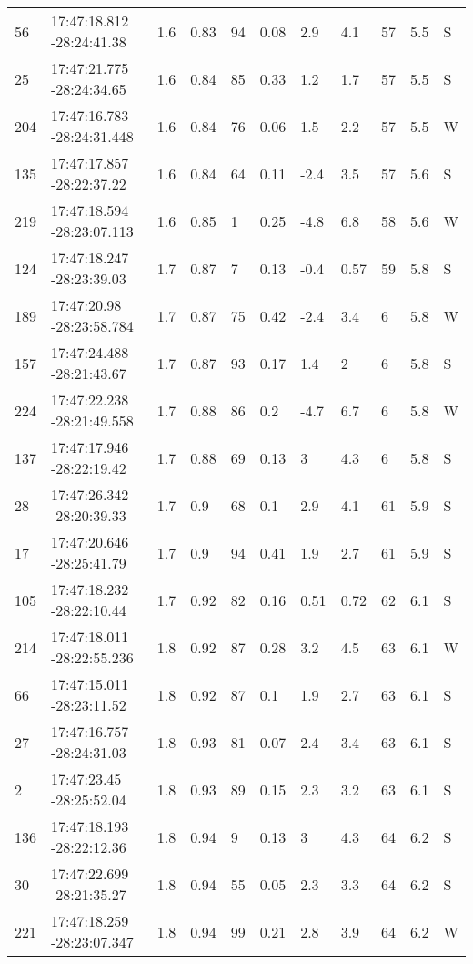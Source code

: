 \begin{deluxetable}[htp]
\begin{tabular}{lllllllllll}
56 & 17:47:18.812 -28:24:41.38 & 1.6 & 0.83 & 94 & 0.08 & 2.9 & 4.1 & 57 & 5.5\ee{24} & S \\
25 & 17:47:21.775 -28:24:34.65 & 1.6 & 0.84 & 85 & 0.33 & 1.2 & 1.7 & 57 & 5.5\ee{24} & S \\
204 & 17:47:16.783 -28:24:31.448 & 1.6 & 0.84 & 76 & 0.06 & 1.5 & 2.2 & 57 & 5.5\ee{24} & W \\
135 & 17:47:17.857 -28:22:37.22 & 1.6 & 0.84 & 64 & 0.11 & -2.4 & 3.5 & 57 & 5.6\ee{24} & S \\
219 & 17:47:18.594 -28:23:07.113 & 1.6 & 0.85 & 1 & 0.25 & -4.8 & 6.8 & 58 & 5.6\ee{24} & W \\
124 & 17:47:18.247 -28:23:39.03 & 1.7 & 0.87 & 7 & 0.13 & -0.4 & 0.57 & 59 & 5.8\ee{24} & S \\
189 & 17:47:20.98 -28:23:58.784 & 1.7 & 0.87 & 75 & 0.42 & -2.4 & 3.4 & 6 & 5.8\ee{24} & W \\
157 & 17:47:24.488 -28:21:43.67 & 1.7 & 0.87 & 93 & 0.17 & 1.4 & 2 & 6 & 5.8\ee{24} & S \\
224 & 17:47:22.238 -28:21:49.558 & 1.7 & 0.88 & 86 & 0.2 & -4.7 & 6.7 & 6 & 5.8\ee{24} & W \\
137 & 17:47:17.946 -28:22:19.42 & 1.7 & 0.88 & 69 & 0.13 & 3 & 4.3 & 6 & 5.8\ee{24} & S \\
28 & 17:47:26.342 -28:20:39.33 & 1.7 & 0.9 & 68 & 0.1 & 2.9 & 4.1 & 61 & 5.9\ee{24} & S \\
17 & 17:47:20.646 -28:25:41.79 & 1.7 & 0.9 & 94 & 0.41 & 1.9 & 2.7 & 61 & 5.9\ee{24} & S \\
105 & 17:47:18.232 -28:22:10.44 & 1.7 & 0.92 & 82 & 0.16 & 0.51 & 0.72 & 62 & 6.1\ee{24} & S \\
214 & 17:47:18.011 -28:22:55.236 & 1.8 & 0.92 & 87 & 0.28 & 3.2 & 4.5 & 63 & 6.1\ee{24} & W \\
66 & 17:47:15.011 -28:23:11.52 & 1.8 & 0.92 & 87 & 0.1 & 1.9 & 2.7 & 63 & 6.1\ee{24} & S \\
27 & 17:47:16.757 -28:24:31.03 & 1.8 & 0.93 & 81 & 0.07 & 2.4 & 3.4 & 63 & 6.1\ee{24} & S \\
2 & 17:47:23.45 -28:25:52.04 & 1.8 & 0.93 & 89 & 0.15 & 2.3 & 3.2 & 63 & 6.1\ee{24} & S \\
136 & 17:47:18.193 -28:22:12.36 & 1.8 & 0.94 & 9 & 0.13 & 3 & 4.3 & 64 & 6.2\ee{24} & S \\
30 & 17:47:22.699 -28:21:35.27 & 1.8 & 0.94 & 55 & 0.05 & 2.3 & 3.3 & 64 & 6.2\ee{24} & S \\
221 & 17:47:18.259 -28:23:07.347 & 1.8 & 0.94 & 99 & 0.21 & 2.8 & 3.9 & 64 & 6.2\ee{24} & W \\

\end{tabular}
\end{deluxetable}
